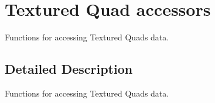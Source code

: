 \hypertarget{group____accessors__quad}{\section{Textured Quad accessors}
\label{group____accessors__quad}
}


Functions for accessing Textured Quads data.  




\subsection{Detailed Description}
Functions for accessing Textured Quads data. 